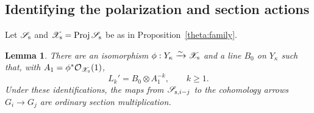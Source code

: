\documentclass[11pt]{article}
\newtheorem{lemma}[theorem]{Lemma}
\theoremstyle{definition}
\theoremstyle{remark}
\numberwithin{equation}{section}
\begin{document}
\subsection{Identifying the polarization and section actions}

Let $\mathscr S_{\rm s}$ and
$\mathscr X_{\rm s}=\operatorname{Proj}\mathscr S_{\rm s}$ be as in
Proposition~\ref{theta:family}.

\begin{lemma}
\label{per:section-ring}
There are an isomorphism
$\phi:Y_\kappa\xrightarrow{\sim}\mathscr X_{\rm s}$ and a line
$B_0$ on $Y_\kappa$ such that, with
$A_1=\phi^*\mathcal O_{\mathscr X_{\rm s}}(1)$,
\begin{equation}
 L_k'=B_0\otimes A_1^{-k},\qquad k\ge1.
 \label{per:line-progression}
\end{equation}
Under these identifications, the maps from
$\mathscr S_{{\rm s},i-j}$ to the cohomology arrows $G_i\to G_j$
are ordinary section multiplication.
\end{lemma}
\end{document}

